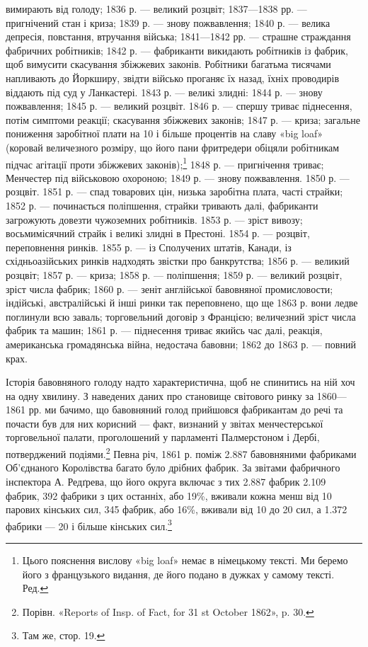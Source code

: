 \parcont{}  %
вимирають від голоду; 1836 р. — великий розцвіт; 1837—1838 рр. —
пригнічений стан і криза; 1839 р. — знову пожвавлення; 1840 р. —
велика депресія, повстання, втручання війська; 1841—1842 рр. —
страшне страждання фабричних робітників; 1842 р. — фабриканти
викидають робітників із фабрик, щоб вимусити скасування збіжжевих
законів. Робітники багатьма тисячами напливають до
Йоркширу, звідти військо проганяє їх назад, їхніх проводирів
віддають під суд у Ланкастері. 1843 р. — великі злидні: 1844 р. —
знову пожвавлення; 1845 р. — великий розцвіт. 1846 р. — спершу
триває піднесення, потім симптоми реакції; скасування збіжжевих
законів; 1847 р. — криза; загальне пониження заробітної плати
на 10 і більше процентів на славу «big loaf» (коровай величезного
розміру, що його пани фритредери обіцяли робітникам підчас
агітації проти збіжжевих законів);\footnote*{
Цього пояснення вислову «big loaf» немає в німецькому тексті.
Ми беремо його з французького видання, де його подано в дужках у самому
тексті. Ред.
} 1848 р. — пригнічення триває;
Менчестер під військовою охороною; 1849 р. — знову пожвавлення.
1850 р. — розцвіт. 1851 р. — спад товарових цін, низька
заробітна плата, часті страйки; 1852 р. — починається поліпшення,
страйки тривають далі, фабриканти загрожують довезти чужоземних
робітників. 1853 р. — зріст вивозу; восьмимісячний страйк
і великі злидні в Престоні. 1854 р. — розцвіт, переповнення ринків.
1855 р. — із Сполучених штатів, Канади, із східньоазійських
ринків надходять звістки про банкрутства; 1856 р. — великий
розцвіт; 1857 р. — криза; 1858 р. — поліпшення; 1859 р. — великий
розцвіт, зріст числа фабрик; 1860 р. — зеніт англійської
бавовняної промисловости; індійські, австралійські й інші ринки
так переповнено, що ще 1863 р. вони ледве поглинули всю заваль;
торговельний договір з Францією; величезний зріст числа фабрик
та машин; 1861 р. — піднесення триває якийсь час далі, реакція,
американська громадянська війна, недостача бавовни; 1862 до
1863 р. — повний крах.

Історія бавовняного голоду надто характеристична, щоб не
спинитись на ній хоч на одну хвилину. З наведених даних про
становище світового ринку за 1860—1861 рр. ми бачимо, що
бавовняний голод прийшовся фабрикантам до речі та почасти був
для них корисний — факт, визнаний у звітах менчестерської
торговельної палати, проголошений у парламенті Палмерстоном
і Дербі, потверджений подіями.\footnote{
Порівн. «Reports of Insp. of Fact, for 31 st October 1862», p. 30.
} Певна річ, 1861 р.
поміж 2.887 бавовняними фабриками Об’єднаного Королівства
багато було дрібних фабрик. За звітами фабричного інспектора
А. Редґрева, що його округа включає з тих 2.887 фабрик 2.109 фабрик,
392 фабрики з цих останніх, або 19\%, вживали кожна
менш від 10 парових кінських сил, 345 фабрик, або 16\%, вживали
від 10 до 20 сил, а 1.372 фабрики — 20 і більше кінських сил.\footnote{
Там же, стор. 19.
}
\parbreak{}  %

